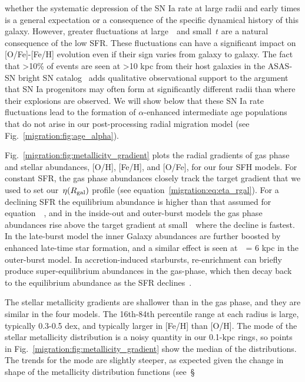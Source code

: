 whether the systematic depression of the SN Ia rate at large radii and early 
times is a general expectation or a consequence of the specific dynamical 
history of this galaxy. 
However, greater fluctuations at large~\rgal~and small~$t$ are a natural 
consequence of the low SFR. These fluctuations can have a significant impact 
on [O/Fe]-[Fe/H] evolution even if their sign varies from galaxy to galaxy. 
The fact that >10\% of events are seen at >10 kpc from their host galaxies in 
the ASAS-SN bright SN catalog~\citep{Holoien2019} adds qualitative 
observational support to the argument that SN Ia progenitors may often form at 
significantly different radii than where their explosions are observed. 
We will show below that these SN Ia rate fluctuations lead to the formation of 
$\alpha$-enhanced intermediate age populations that do not arise in our 
post-processing radial migration model (see Fig.~\ref{migration:fig:age_alpha}). 
\par 
Fig.~\ref{migration:fig:metallicity_gradient} plots the radial gradients of gas phase 
and stellar abundances, [O/H], [Fe/H], and [O/Fe], for our four SFH models. 
For constant SFR, the gas phase abundances closely track the target gradient 
that we used to set our~$\eta(R_\text{gal})$ profile (see equation~\ref{migration:eq:eta_rgal}). 
For a declining SFR the equilibrium abundance is higher than that assumed for 
equation~~\citep[see][]{Weinberg2017b}, and in the inside-out 
and outer-burst models the gas phase abundances rise above the target gradient 
at small~\rgal~where the decline is fastest. 
In the late-burst model the inner Galaxy abundances are further boosted by 
enhanced late-time star formation, and a similar effect is seen at~\rgal~= 6 
kpc in the outer-burst model. 
In accretion-induced starbursts, re-enrichment can briefly produce 
super-equilibrium abundances in the gas-phase, which then decay back to the 
equilibrium abundance as the SFR declines~\citep{Johnson2020}. 
\par 
The stellar metallicity gradients are shallower than in the gas phase, and 
they are similar in the four models. 
The 16th-84th percentile range at each radius is large, typically 0.3-0.5 
dex, and typically larger in [Fe/H] than [O/H]. 
The mode of the stellar metallicity distribution is a noisy quantity in our 
0.1-kpc rings, so points in Fig.~\ref{migration:fig:metallicity_gradient} show the 
median of the distributions. 
The trends for the mode are slightly steeper, as expected given the change in 
shape of the metallicity distribution functions (see~\S 
